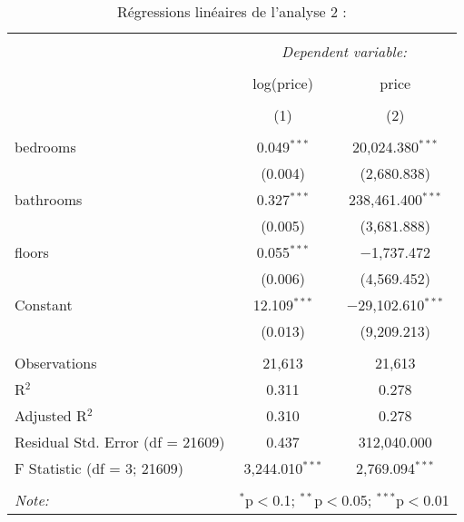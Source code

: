 \documentclass[
  11pt,
  french,
]{article}
\begin{document}
\begin{table}[!htbp] \centering 
  \caption{Régressions linéaires de l'analyse 2 :} 
  \label{} 
\small 
\begin{tabular}{@{\extracolsep{1pt}}lcc} 
\\[-1.8ex]\hline 
\hline \\[-1.8ex] 
 & \multicolumn{2}{c}{\textit{Dependent variable:}} \\ 
\cline{2-3} 
\\[-1.8ex] & log(price) & price \\ 
\\[-1.8ex] & (1) & (2)\\ 
\hline \\[-1.8ex] 
 bedrooms & 0.049$^{***}$ & 20,024.380$^{***}$ \\ 
  & (0.004) & (2,680.838) \\ 
  bathrooms & 0.327$^{***}$ & 238,461.400$^{***}$ \\ 
  & (0.005) & (3,681.888) \\ 
  floors & 0.055$^{***}$ & $-$1,737.472 \\ 
  & (0.006) & (4,569.452) \\ 
  Constant & 12.109$^{***}$ & $-$29,102.610$^{***}$ \\ 
  & (0.013) & (9,209.213) \\ 
 \hline \\[-1.8ex] 
Observations & 21,613 & 21,613 \\ 
R$^{2}$ & 0.311 & 0.278 \\ 
Adjusted R$^{2}$ & 0.310 & 0.278 \\ 
Residual Std. Error (df = 21609) & 0.437 & 312,040.000 \\ 
F Statistic (df = 3; 21609) & 3,244.010$^{***}$ & 2,769.094$^{***}$ \\ 
\hline 
\hline \\[-1.8ex] 
\textit{Note:}  & \multicolumn{2}{r}{$^{*}$p$<$0.1; $^{**}$p$<$0.05; $^{***}$p$<$0.01} \\ 
\end{tabular} 
\end{table}
\end{document}
